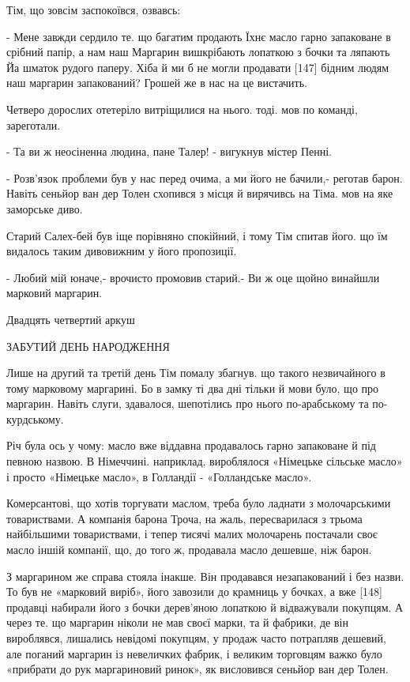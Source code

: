 Тім, що зовсім заспокоївся, озвавсь:

- Мене завжди сердило те. що багатим продають Їхнє масло гарно запаковане в срібний папір, а нам наш Маргарин вишкрібають лопаткою з бочки та ляпають Йа шматок рудого паперу. Хіба й ми б не могли продавати [147] бідним людям наш маргарин запакований? Грошей же в нас на це вистачить.

Четверо дорослих отетеріло витріщилися на нього. тоді. мов по команді, зареготали.

- Та ви ж неосіненна людина, пане Талер! - вигукнув містер Пенні.

- Розв'язок проблеми був у нас перед очима, а ми його не бачили,- реготав барон. Навіть сеньйор ван дер Толен схопився з місця й вирячивсь на Тіма. мов на яке заморське диво.

Старий Салех-бей був іще порівняно спокійний, і тому Тім спитав його. що їм видалось таким дивовижним у його пропозиції.

- Любий мій юначе,- врочисто промовив старий.- Ви ж оце щойно винайшли марковий маргарин.

Двадцять четвертий аркуш

ЗАБУТИЙ ДЕНЬ НАРОДЖЕННЯ

Лише на другий та третій день Тім помалу збагнув. що такого незвичайного в тому марковому маргарині. Бо в замку ті два дні тільки й мови було, що про маргарин. Навіть слуги, здавалося, шепотілись про нього по-арабському та по-курдському.

Річ була ось у чому: масло вже віддавна продавалось гарно запаковане й під певною назвою. В Німеччині. наприклад, вироблялося «Німецьке сільське масло» і просто «Німецьке масло», в Голландії - «Голландське масло».

Комерсантові, що хотів торгувати маслом, треба було ладнати з молочарськими товариствами. А компанія барона Троча, на жаль, пересварилася з трьома найбільшими товариствами, і тепер тисячі малих молочарень постачали своє масло іншій компанії, що, до того ж, продавала масло дешевше, ніж барон.

З маргарином же справа стояла інакше. Він продавався незапакований і без назви. То був не «марковий виріб», його завозили до крамниць у бочках, а вже [148] продавці набирали його з бочки дерев'яною лопаткою й відважували покупцям. А через те. що маргарин ніколи не мав своєї марки, та й фабрики, де він вироблявся, лишались невідомі покупцям, у продаж часто потрапляв дешевий, але поганий маргарин із невеличких фабрик, і великим торговцям важко було «прибрати до рук маргариновий ринок», як висловився сеньйор ван дер Толен.

